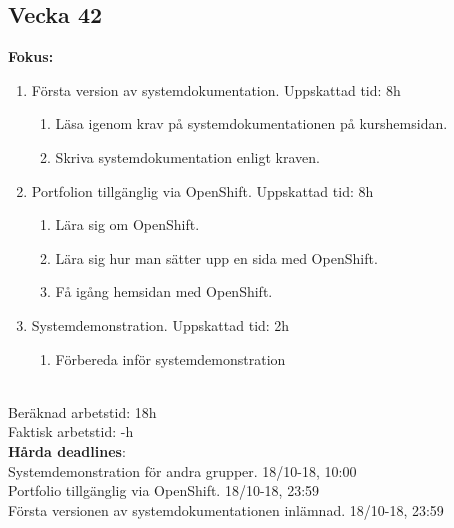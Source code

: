 \documentclass{TDP003mall}
\begin{document}
\subsection{Vecka 42}
\textbf{Fokus:}
\begin{enumerate}
    \item Första version av systemdokumentation. Uppskattad tid: 8h
    \begin{enumerate}
        \item Läsa igenom krav på systemdokumentationen på kurshemsidan.
        \item Skriva systemdokumentation enligt kraven.
    \end{enumerate}
    \item Portfolion tillgänglig via OpenShift. Uppskattad tid: 8h
    \begin{enumerate}
        \item Lära sig om OpenShift.
        \item Lära sig hur man sätter upp en sida med OpenShift.
        \item Få igång hemsidan med OpenShift.
    \end{enumerate}
    \item Systemdemonstration. Uppskattad tid: 2h
    \begin{enumerate}
        \item Förbereda inför systemdemonstration
    \end{enumerate}
\end{enumerate}
\\
Beräknad arbetstid: 18h\\
Faktisk arbetstid: -h\\

\textbf{Hårda deadlines}:\\
Systemdemonstration för andra grupper. 18/10-18, 10:00\\
Portfolio tillgänglig via OpenShift. 18/10-18, 23:59\\
Första versionen av systemdokumentationen inlämnad. 18/10-18, 23:59\\\\
\end{document}

